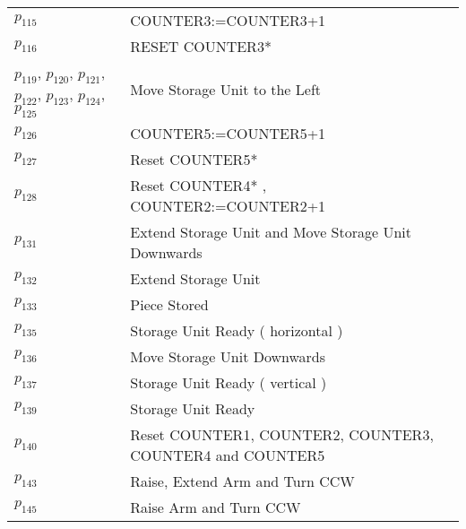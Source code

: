 \begin{longtable}{M{5cm}M{10cm}}
\hyperlink{completeNet:p115}{\hypertarget{completeTable:p115}{$p_{115}$}} & COUNTER3:=COUNTER3+1\\
\hyperlink{completeNet:p116}{\hypertarget{completeTable:p116}{$p_{116}$}} & RESET COUNTER3*\\
\hyperlink{completeNet:p119}{\hypertarget{completeTable:p119}{$p_{119}$}}, \hyperlink{completeNet:p120}{\hypertarget{completeTable:p120}{$p_{120}$}}, \hyperlink{completeNet:p121}{\hypertarget{completeTable:p121}{$p_{121}$}}, \hyperlink{completeNet:p122}{\hypertarget{completeTable:p122}{$p_{122}$}}, \hyperlink{completeNet:p123}{\hypertarget{completeTable:p123}{$p_{123}$}}, \hyperlink{completeNet:p124}{\hypertarget{completeTable:p124}{$p_{124}$}}, \hyperlink{completeNet:p125}{\hypertarget{completeTable:p125}{$p_{125}$}} & Move Storage Unit to the Left\\
\hyperlink{completeNet:p126}{\hypertarget{completeTable:p126}{$p_{126}$}} & COUNTER5:=COUNTER5+1\\
\hyperlink{completeNet:p127}{\hypertarget{completeTable:p127}{$p_{127}$}} & Reset COUNTER5*\\
\hyperlink{completeNet:p128}{\hypertarget{completeTable:p128}{$p_{128}$}} & Reset COUNTER4* , COUNTER2:=COUNTER2+1\\
\hyperlink{completeNet:p131}{\hypertarget{completeTable:p131}{$p_{131}$}} & Extend Storage Unit and Move Storage Unit Downwards\\
\hyperlink{completeNet:p132}{\hypertarget{completeTable:p132}{$p_{132}$}} & Extend Storage Unit\\
\hyperlink{completeNet:p133}{\hypertarget{completeTable:p133}{$p_{133}$}} & Piece Stored\\
\hyperlink{completeNet:p135}{\hypertarget{completeTable:p135}{$p_{135}$}} & Storage Unit Ready ( horizontal )\\
\hyperlink{completeNet:p136}{\hypertarget{completeTable:p136}{$p_{136}$}} & Move Storage Unit Downwards\\
\hyperlink{completeNet:p137}{\hypertarget{completeTable:p137}{$p_{137}$}} & Storage Unit Ready ( vertical )\\
\hyperlink{completeNet:p139}{\hypertarget{completeTable:p139}{$p_{139}$}} & Storage Unit Ready\\
\hyperlink{completeNet:p140}{\hypertarget{completeTable:p140}{$p_{140}$}} & Reset COUNTER1, COUNTER2, COUNTER3, COUNTER4 and COUNTER5\\
\hyperlink{completeNet:p143}{\hypertarget{completeTable:p143}{$p_{143}$}} & Raise, Extend Arm and Turn CCW\\
\hyperlink{completeNet:p145}{\hypertarget{completeTable:p145}{$p_{145}$}} & Raise Arm and Turn CCW\\
\end{longtable}
